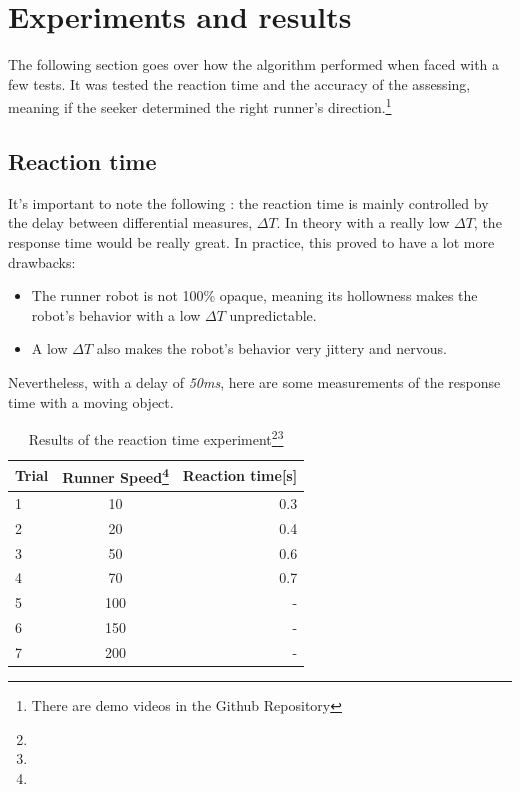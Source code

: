 \documentclass[sigconf,nonacm]{acmart}
\begin{document}
\section{Experiments and results}

The following section goes over how the algorithm performed when faced with a
few tests. It was tested the reaction time and the accuracy of the assessing,
meaning if the seeker determined the right runner's direction.\footnote[1]{There
are demo videos in the Github Repository}


\subsection{Reaction time}
\label{chap:reaction}

It's important to note the following : the reaction time is mainly controlled by
the delay between differential measures, \textit{$ \Delta T$}. In theory with a really low $ \Delta T$, the
response time would be really great. In practice, this proved to have a lot more
drawbacks:
\begin{itemize}
      \item The runner robot is not 100\% opaque, meaning its hollowness makes
      the robot's behavior with a low  $ \Delta T$ unpredictable.

      \item A low $ \Delta T$ also makes the robot's behavior very jittery and nervous.
      
\end{itemize}

Nevertheless, with a delay of \textit{50ms}, here are some measurements of the
response time with a moving object.



\begin{table}[h]
      \caption[short]{Results of the reaction time experiment\footnote[2]{}\footnote[3]{}}
      \begin{tabular}{l|c|r}
            \toprule
            Trial     &     Runner Speed\footnote[4]{}     &     Reaction time[s]\\
            \midrule    
            1     &     10     &     0.3\\
            2     &     20     &     0.4\\
            3     &     50     &     0.6\\
            4     &     70     &     0.7\\
            5     &     100    &     -\\
            6     &     150    &     -\\
            7     &     200    &     -\\
            \bottomrule
      \end{tabular}
\end{table}
\end{document}
